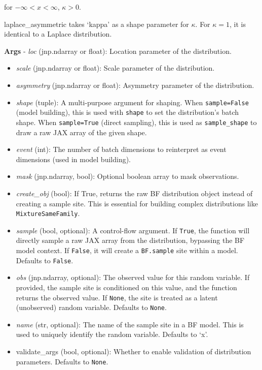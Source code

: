 \documentclass[
  letterpaper,
  DIV=11,
  numbers=noendperiod]{scrartcl}
\begin{document}
for \(-\infty < x < \infty\), \(\kappa > 0\).

laplace\_asymmetric takes `kappa' as a shape parameter for \(\kappa\).
For \(\kappa = 1\), it is identical to a Laplace distribution.

\textbf{Args} - \emph{loc} (jnp.ndarray or float): Location parameter of
the distribution.

\begin{itemize}
\item
  \emph{scale} (jnp.ndarray or float): Scale parameter of the
  distribution.
\item
  \emph{asymmetry} (jnp.ndarray or float): Asymmetry parameter of the
  distribution.
\item
  \emph{shape} (tuple): A multi-purpose argument for shaping. When
  \texttt{sample=False} (model building), this is used with
  \texttt{shape} to set the distribution's batch shape. When
  \texttt{sample=True} (direct sampling), this is used as
  \texttt{sample\_shape} to draw a raw JAX array of the given shape.
\item
  \emph{event} (int): The number of batch dimensions to reinterpret as
  event dimensions (used in model building).
\item
  \emph{mask} (jnp.ndarray, bool): Optional boolean array to mask
  observations.
\item
  \emph{create\_obj} (bool): If True, returns the raw BF distribution
  object instead of creating a sample site. This is essential for
  building complex distributions like \texttt{MixtureSameFamily}.
\item
  \emph{sample} (bool, optional): A control-flow argument. If
  \texttt{True}, the function will directly sample a raw JAX array from
  the distribution, bypassing the BF model context. If \texttt{False},
  it will create a \texttt{BF.sample} site within a model. Defaults to
  \texttt{False}.
\item
  \emph{obs} (jnp.ndarray, optional): The observed value for this random
  variable. If provided, the sample site is conditioned on this value,
  and the function returns the observed value. If \texttt{None}, the
  site is treated as a latent (unobserved) random variable. Defaults to
  \texttt{None}.
\item
  \emph{name} (str, optional): The name of the sample site in a BF
  model. This is used to uniquely identify the random variable. Defaults
  to `x'.
\item
  validate\_args (bool, optional): Whether to enable validation of
  distribution parameters. Defaults to \texttt{None}.
\end{itemize}
\end{document}
